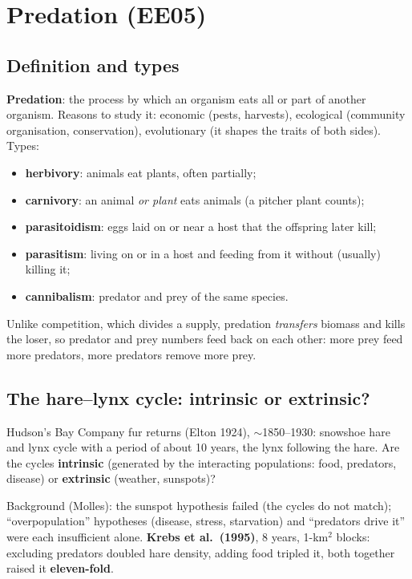 \section{Predation (EE05)}

\subsection{Definition and types}
\textbf{Predation}: the process by which an organism eats all or part of another organism. Reasons to study it:
economic (pests, harvests), ecological (community organisation, conservation), evolutionary (it shapes the traits of
both sides). Types:
\begin{itemize}
\item \textbf{herbivory}: animals eat plants, often partially;
\item \textbf{carnivory}: an animal \emph{or plant} eats animals (a pitcher plant counts);
\item \textbf{parasitoidism}: eggs laid on or near a host that the offspring later kill;
\item \textbf{parasitism}: living on or in a host and feeding from it without (usually) killing it;
\item \textbf{cannibalism}: predator and prey of the same species.
\end{itemize}
Unlike competition, which divides a supply, predation \emph{transfers} biomass and kills the loser, so predator and
prey numbers feed back on each other: more prey feed more predators, more predators remove more prey.

\subsection{The hare--lynx cycle: intrinsic or extrinsic?}
Hudson's Bay Company fur returns (Elton 1924), $\sim$1850--1930: snowshoe hare and lynx cycle with a period of about
10 years, the lynx following the hare. Are the cycles \textbf{intrinsic} (generated by the interacting populations:
food, predators, disease) or \textbf{extrinsic} (weather, sunspots)?

Background (Molles): the sunspot hypothesis failed (the cycles do not match); ``overpopulation'' hypotheses
(disease, stress, starvation) and ``predators drive it'' were each insufficient alone. \textbf{Krebs et al.\ (1995)},
8 years, 1-km$^2$ blocks: excluding predators doubled hare density, adding food tripled it, both together raised it
\textbf{eleven-fold}.

